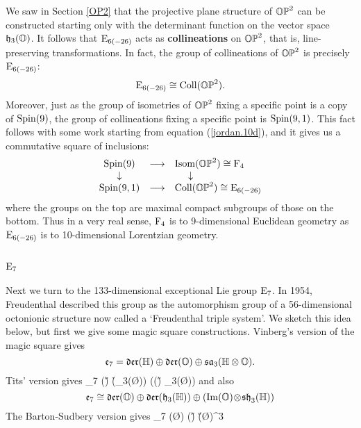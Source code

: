 We saw in Section \ref{OP2} that the projective plane structure of
${\mathbb {OP}}^2$ can be constructed starting only with the determinant function
on the vector space ${\mathfrak {h}}_3({\mathbb O})$.   It follows that ${\rm E}_{6(-26)}$
acts as {\bf collineations} on ${\mathbb {OP}}^2$, that is, line-preserving
transformations.  In fact, the group of collineations of ${\mathbb {OP}}^2$ is
precisely ${\rm E}_{6(-26)}$:
\[   {\rm E}_{6(-26)}  \cong     {\rm Coll}({\mathbb {OP}}^2). \]
Moreover, just as the group of isometries of ${\mathbb {OP}}^2$ fixing a specific
point is a copy of ${\rm Spin}(9)$, the group of collineations fixing a
specific point is ${\rm Spin}(9,1)$.  This fact follows with some work
starting from equation (\ref{jordan.10d}), and it gives us a commutative
square of inclusions:
\[
\begin{array}{ccl} 
   {\rm Spin}(9) &\longrightarrow& {\rm Isom}({\mathbb {OP}}^2) \cong {\rm F}_4 \\
   \downarrow & &     \;\;\;\;\;  \downarrow  \\
   {\rm Spin}(9,1)    & \longrightarrow & {\rm Coll}({\mathbb {OP}}^2) \cong {\rm E}_{6(-26)} 
\end{array}
\]
where the groups on the top are maximal compact subgroups of those on
the bottom.  Thus in a very real sense, ${\rm F}_4$ is to 9-dimensional
Euclidean geometry as ${\rm E}_{6(-26)}$ is to 10-dimensional Lorentzian
geometry.

\subsection{${\rm E}_7$}  \label{E7}   

Next we turn to the 133-dimensional exceptional Lie group ${\rm E}_7$.
In 1954, Freudenthal \cite{Freudenthal2} described this group as
the automorphism group of a 56-dimensional octonionic structure now
called a `Freudenthal triple system'.  We sketch this idea
below, but first we give some magic square constructions.
Vinberg's version of the magic square gives
\[
{\mathfrak {e}}_7 = {\mathfrak {der}}({\mathbb H}) \oplus {\mathfrak {der}}({\mathbb O}) \oplus {\mathfrak {sa}}_3({\mathbb H} \otimes {\mathbb O})  .
\label{e7.1}
\]
Tits' version gives
\be
\e_7 \iso \Der(\H) \oplus \Der(\h_3(\O)) \oplus    
(\Im(\H) \!\tensor \! \sh_3(\O))  
\label{e7.2}
\ee
and also
\[
{\mathfrak {e}}_7 \cong {\mathfrak {der}}({\mathbb O}) \oplus {\mathfrak {der}}({\mathfrak {h}}_3({\mathbb H})) \oplus    
({\rm Im}({\mathbb O}) \!\otimes \! {\mathfrak {sh}}_3({\mathbb H}))  
\label{e7.3}
\]
The Barton-Sudbery version gives
\be
\e_7 \iso \Tri(\O) \oplus \Tri(\H) \oplus (\H \tensor \O)^3 
\label{e7.4}
\ee
   
